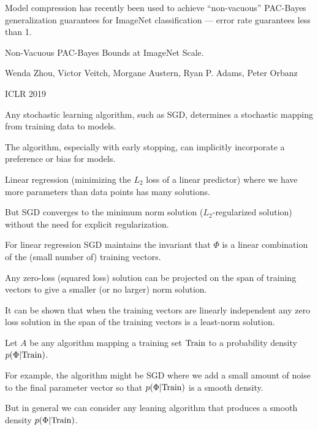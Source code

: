{

Model compression has recently been used to achieve ``non-vacuous'' PAC-Bayes generalization guarantees for ImageNet classification
--- error rate guarantees less than 1.

\vfill
Non-Vacuous PAC-Bayes Bounds at ImageNet Scale.

\bigskip
Wenda Zhou, Victor Veitch, Morgane Austern, Ryan P. Adams, Peter Orbanz

\bigskip
ICLR 2019


Any stochastic learning algorithm, such as SGD, determines a stochastic mapping from training data to models.

\vfill
The algorithm, especially with early stopping, can implicitly incorporate a preference or bias for models.


Linear regression (minimizing the $L_2$ loss of a linear predictor) where we have more parameters than data points
has many solutions.

\vfill
But SGD converges to the minimum norm solution ($L_2$-regularized solution) without the need for explicit regularization.


For linear regression SGD maintains the invariant that $\Phi$ is a linear combination of the (small number of) training vectors.

\vfill
Any zero-loss (squared loss) solution can be projected on the span of training vectors to give a smaller (or no larger) norm solution.

\vfill
It can be shown that when the training vectors are linearly independent any zero loss solution in the span of the training vectors is a least-norm solution.


Let $A$ be any algorithm mapping a training set $\mathrm{Train}$ to a probability density $p(\Phi|\mathrm{Train})$.

\vfill
For example, the algorithm might be SGD where we add a small amount of noise to the final parameter vector so that $p(\Phi|\mathrm{Train})$ is a smooth density.

\vfill
But in general we can consider any leaning algorithm that produces a smooth density $p(\Phi|\mathrm{Train})$.

}
